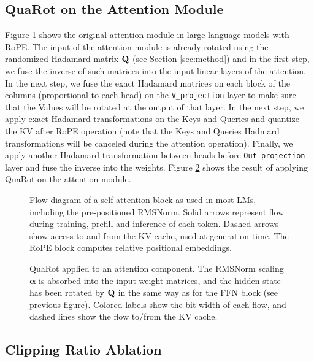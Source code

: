 \subsection{QuaRot on the Attention Module}\label{sec:appx_attention_detailed}

Figure \ref{fig:attn_orig} shows the original attention module in large language models with RoPE. The input of the attention module is already rotated using the randomized Hadamard matrix ${\mathbf{Q}}$ (see Section \ref{sec:method}) and in the first step, we fuse the inverse of such matrices into the input linear layers of the attention. In the next step, we fuse the exact Hadamard matrices on each block of the columns (proportional to each head) on the \texttt{V\_projection} layer to make sure that the Values will be rotated at the output of that layer. In the next step, we apply exact Hadamard transformations on the Keys and Queries and quantize the KV after RoPE operation (note that the Keys and Queries Hadmard transformations will be canceled during the attention operation). Finally, we apply another Hadamard transformation between heads before \texttt{Out\_projection} layer and fuse the inverse into the weights. Figure \ref{fig:attn_quarot} shows the result of applying QuaRot on the attention module.

\begin{figure}[h!]
    \centering
    \scalebox{0.8}{}
    \caption{Flow diagram of a self-attention block as used in most LMs, including the pre-positioned RMSNorm. Solid arrows represent flow during training, prefill and inference of each token. Dashed arrows show access to and from the KV cache, used at generation-time. The RoPE block computes relative positional embeddings. }
    \label{fig:attn_orig}
\end{figure}
%
\begin{figure}[h!]
    \centering
    \hspace*{-5mm}\scalebox{0.8}{}
    \caption{QuaRot applied to an attention component. The RMSNorm scaling $\boldsymbol\alpha$ is absorbed into the input weight matrices, and the hidden state has been rotated by ${\mathbf{Q}}$ in the same way as for the FFN block (see previous figure). Colored labels show the bit-width of each flow, and dashed lines show the flow to/from the KV cache. }
    \label{fig:attn_quarot}
\end{figure}



\subsection{Clipping Ratio Ablation}\label{sec:appx_clip_ratio}

